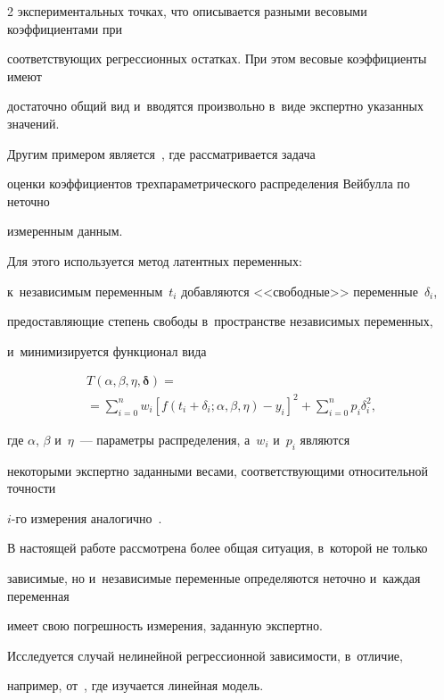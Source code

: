 \begin{multicols}{2}
экспериментальных точках, что описывается разными весовыми коэффициентами при

соответствующих регрессионных остат\-ках. При этом весовые коэффициенты имеют 

достаточно общий вид и~вводятся произвольно в~виде экспертно указанных значений.



Другим примером является~\cite{jukic2010nonlinear}, где рассматривается задача 

оценки коэффициентов трех\-па\-ра\-мет\-ри\-че\-ско\-го распределения Вейбулла по неточно 

измеренным данным.

Для этого используется метод латентных переменных: 

к~независимым переменным~$t_i$ добавляются <<свободные>> переменные~$\delta_i$,

предоставляющие степень свободы в~про\-стран\-ст\-ве независимых переменных, 

и~минимизируется функционал вида

\begin{multline*}

  T(\alpha, \beta, \eta, \boldsymbol{\delta}) ={}\\

  {}= \sum\limits_{i = 0}^n w_i \left[f(t_i + 

\delta_i; \alpha, \beta, \eta) - y_i\right]^2 +\sum\limits_{i = 0}^n p_i \delta_i^2,

\end{multline*}

где $\alpha$, $\beta$ и~$\eta$~--- параметры распределения, а~$w_i$ и~$p_i$ являются

некоторыми экспертно заданными весами, соответствующими относительной точ\-ности

\mbox{$i$-го} измерения аналогично~\cite{jukic2013nonlinear}.



В настоящей работе рассмотрена более общая ситуация, в~которой не только 

зависимые, но и~независимые переменные определяются неточно и~каж\-дая переменная

имеет свою погрешность измерения, заданную экспертно.

Исследуется случай нелинейной регрессионной зависимости, в~отличие, 

например,  от~\cite{kiryati2000heteroscedastic}, где изучается линейная модель.


\end{multicols}
